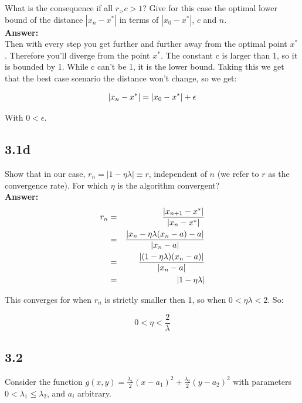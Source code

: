 \documentclass[a4paper]{article}
\begin{document}
What is the consequence if all $r_ > c > 1$? Give for this case the optimal lower bound of the distance $|x_n - x^*|$ in terms of $|x_0 - x^*|$, $c$ and $n$.\\

\textbf{Answer:}\\


Then with every step you get further and further away from the optimal point $x^*$. Therefore you'll diverge from the point $x^*$. The constant c is larger than 1, so it is bounded by 1. While c can't be 1, it is the lower bound. Taking this we get that the best case scenario the distance won't change, so we get:

\begin{equation}
\abs{x_n-x^*} = \abs{x_0-x^*} + \epsilon
\end{equation}

With $0 < \epsilon$.

\subsection*{3.1d}

Show that in our case, $r_n = |1 - \eta \lambda| \equiv r$, independent of $n$ (we refer to $r$ as the convergence rate). For which $\eta$ is the algorithm convergent?\\

\textbf{Answer:}\\

\begin{eqnarray}
r_n &=& \frac{\abs{x_{n+1} - x^*}}{\abs{x_n - x^*}}\\
&=& \frac{\abs{ x_n - \eta \lambda (x_n - a) - a}}{\abs{x_n - a}}\\
&=& \frac{\abs{(1-\eta \lambda) (x_n - a)}}{\abs{x_n - a}}\\
&=& \abs{1-\eta \lambda}
\end{eqnarray}


This converges for when $r_n$ is strictly smaller then 1, so when $0 < \eta \lambda < 2$. So:

\begin{equation}
0 < \eta < \frac{2}{\lambda }
\end{equation}




\subsection*{3.2}

Consider the function $g(x, y) = \frac{\lambda_1}{2}(x - a_1)^2 + \frac{\lambda_2}{2} (y - a_2)^2$ with parameters $0 < \lambda_1 \leq \lambda_2$, and $a_i$ arbitrary.
\end{document}
